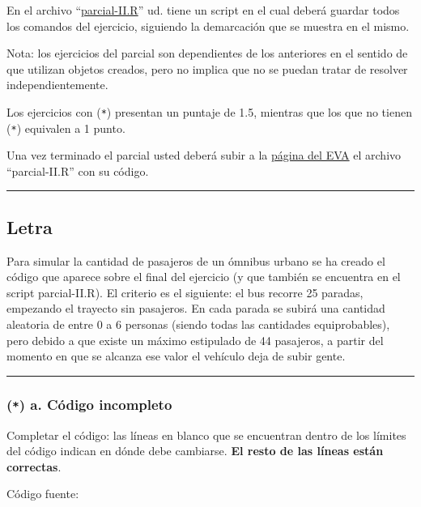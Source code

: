 \documentclass[]{article}
\begin{document}
En el archivo
``\href{http://eva.universidad.edu.uy/file.php/1454/ejercicios\_de\_programacion/parcial-II.R}{parcial-II.R}''
ud. tiene un script en el cual deberá guardar todos los comandos del
ejercicio, siguiendo la demarcación que se muestra en el mismo.

Nota: los ejercicios del parcial son dependientes de los anteriores en
el sentido de que utilizan objetos creados, pero no implica que no se
puedan tratar de resolver independientemente.

Los ejercicios con (\texttt{*}) presentan un puntaje de 1.5, mientras
que los que no tienen (\texttt{*}) equivalen a 1 punto.

Una vez terminado el parcial usted deberá subir a la
\href{http://eva.universidad.edu.uy/mod/assignment/view.php?id=102998}{página
del EVA} el archivo ``parcial-II.R'' con su código.

\begin{center}\rule{3in}{0.4pt}\end{center}

\subsection{Letra}

Para simular la cantidad de pasajeros de un ómnibus urbano se ha creado
el código que aparece sobre el final del ejercicio (y que también se
encuentra en el script parcial-II.R). El criterio es el siguiente: el
bus recorre 25 paradas, empezando el trayecto sin pasajeros. En cada
parada se subirá una cantidad aleatoria de entre 0 a 6 personas (siendo
todas las cantidades equiprobables), pero debido a que existe un máximo
estipulado de 44 pasajeros, a partir del momento en que se alcanza ese
valor el vehículo deja de subir gente.

\begin{center}\rule{3in}{0.4pt}\end{center}

\subsubsection{(\texttt{*}) a. Código incompleto}

Completar el código: las líneas en blanco que se encuentran dentro de
los límites del código indican en dónde debe cambiarse. \textbf{El resto
de las líneas están correctas}.

Código fuente:
\end{document}
